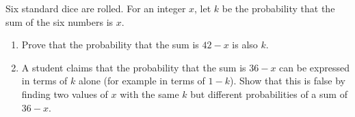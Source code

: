 Six standard dice are rolled. For an integer $x$, let $k$ be the probability that the sum of the six numbers is $x$.
\begin{enumerate}
\item[(a)] Prove that the probability that the sum is $42-x$ is also $k$.
\item[(b)] A student claims that the probability that the sum is $36-x$ can be expressed in terms of $k$ alone (for example in terms of $1-k$). Show that this is false by finding two values of $x$ with the same $k$ but different probabilities of a sum of $36-x$.
\end{enumerate}
